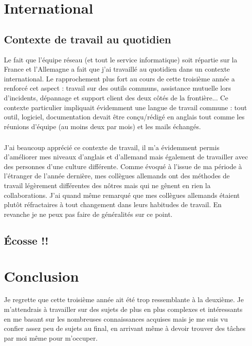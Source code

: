 \documentclass[a4paper,12pt]{report}
\begin{document}
\chapter{International}
\section{Contexte de travail au quotidien}
Le fait que l'équipe réseau (et tout le service informatique) soit répartie sur la France et l'Allemagne a fait que j'ai travaillé au quotidien dans un contexte international. Le rapprochement plus fort au cours de cette troisième année a renforcé cet aspect : travail sur des outils communs, assistance mutuelle lors d'incidents, dépannage et support client des deux côtés de la frontière... Ce contexte particulier impliquait évidemment une langue de travail commune : tout outil, logiciel, documentation devait être conçu/rédigé en anglais tout comme les réunions d'équipe (au moins deux par mois) et les mails échangés.	
\paragraph{}
J'ai beaucoup apprécié ce contexte de travail, il m'a évidemment permis d'améliorer mes niveaux d'anglais et d'allemand mais également de travailler avec des personnes d'une culture différente. Comme évoqué à l'issue de ma période à l'étranger de l'année dernière, mes collègues allemands ont des méthodes de travail légèrement différentes des nôtres mais qui ne gênent en rien la collaborations. J'ai quand même remarqué que mes collègues allemands étaient plutôt réfractaires à tout changement dans leurs habitudes de travail. En revanche je ne peux pas faire de généralités sur ce point.

\section{Écosse !!}

\chapter{Conclusion}

Je regrette que cette troisième année ait été trop ressemblante à la deuxième. Je m'attendrais à travailler sur des sujets de plus en plus complexes et intéressants en me basant sur les nombreuses connaissances acquises mais je me suis vu confier assez peu de sujets au final, en arrivant même à devoir trouver des tâches par moi même pour m'occuper.
\end{document}
